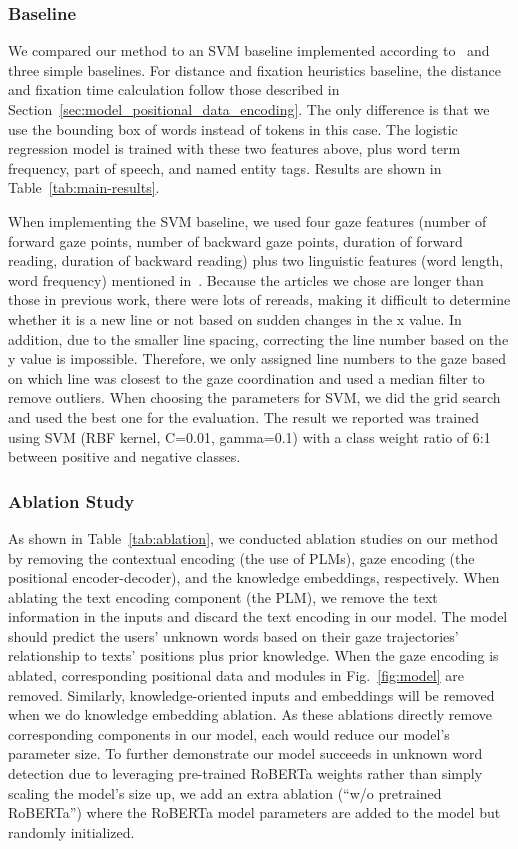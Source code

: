 

\subsubsection{Baseline}
We compared our method to an SVM baseline implemented according to~\cite{gaze-text_garain_2017} and three simple baselines. For distance and fixation heuristics baseline, the distance and fixation time calculation follow those described in Section~\ref{sec:model_positional_data_encoding}. The only difference is that we use the bounding box of words instead of tokens in this case. The logistic regression model is trained with these two features above, plus word term frequency, part of speech, and named entity tags. Results are shown in Table~\ref{tab:main-results}.

When implementing the SVM baseline, we used four gaze features (number of forward gaze points, number of backward gaze points, duration of forward reading, duration of backward reading) plus two linguistic features (word length, word frequency) mentioned in~\cite{gaze-text_garain_2017}. Because the articles we chose are longer than those in previous work, there were lots of rereads, making it difficult to determine whether it is a new line or not based on sudden changes in the x value. In addition, due to the smaller line spacing, correcting the line number based on the y value is impossible. Therefore, we only assigned line numbers to the gaze based on which line was closest to the gaze coordination and used a median filter to remove outliers. When choosing the parameters for SVM, we did the grid search and used the best one for the evaluation. The result we reported was trained using SVM (RBF kernel, C=0.01, gamma=0.1) with a class weight ratio of 6:1 between positive and negative classes.

\subsubsection{Ablation Study}
As shown in Table~\ref{tab:ablation}, we conducted ablation studies on our method by removing the contextual encoding (the use of PLMs), gaze encoding (the positional encoder-decoder), and the knowledge embeddings, respectively. When ablating the text encoding component (the PLM), we remove the text information in the inputs and discard the text encoding in our model. The model should predict the users' unknown words based on their gaze trajectories' relationship to texts' positions plus prior knowledge. When the gaze encoding is ablated, corresponding positional data and modules in Fig.~\ref{fig:model} are removed. Similarly, knowledge-oriented inputs and embeddings will be removed when we do knowledge embedding ablation. As these ablations directly remove corresponding components in our model, each would reduce our model's parameter size. To further demonstrate our model succeeds in unknown word detection due to leveraging pre-trained RoBERTa weights rather than simply scaling the model's size up, we add an extra ablation (``w/o pretrained RoBERTa'') where the RoBERTa model parameters are added to the model but randomly initialized.


